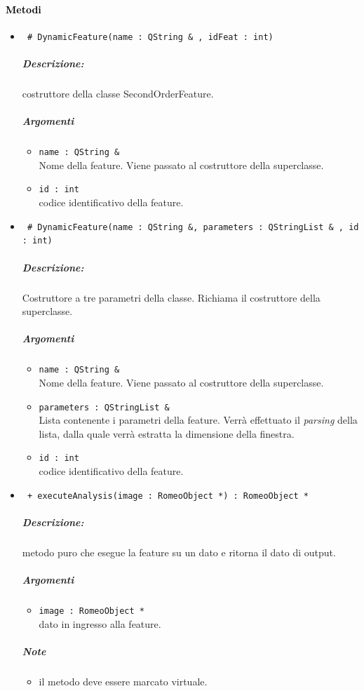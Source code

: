 \paragraph{\textcolor{black}{Metodi\\}}
	\begin{itemize}
	\item \color{blue}\verb! # DynamicFeature(name : QString & , idFeat : int)!
		\color{black}
		\subparagraph{Descrizione:} costruttore della classe SecondOrderFeature.
		\subparagraph{Argomenti}
			\begin{itemize}
				\item \color{RoyalPurple} \verb!name : QString &! \\ 
				\color{black} Nome della feature. Viene passato al costruttore della superclasse.	
				\item \color{RoyalPurple} \verb!id : int! \\ 
				\color{black} codice identificativo della feature\g{}.	
			\end{itemize}
			
	\item \color{blue}\verb! # DynamicFeature(name : QString &, parameters : QStringList & , id : int)!
		\color{black}
		\subparagraph{Descrizione:} Costruttore a tre parametri della classe. Richiama il costruttore della 						superclasse.
		\subparagraph{Argomenti}
			\begin{itemize}
				\item \color{RoyalPurple} \verb!name : QString &! \\ 
				\color{black} Nome della feature. Viene passato al costruttore della superclasse.	
				\item \color{RoyalPurple} \verb!parameters : QStringList &! \\ 
				\color{black} Lista contenente i parametri della feature\g{}. Verrà effettuato il \textit{parsing} 						della lista, dalla quale verrà estratta la dimensione della finestra.
				\item \color{RoyalPurple} \verb!id : int! \\ 
				\color{black} codice identificativo della feature\g{}.	
			\end{itemize}
			
	\item \color{blue}\verb! + executeAnalysis(image : RomeoObject *) : RomeoObject *!
		\color{black}
		\subparagraph{Descrizione:} metodo puro che esegue la feature su un dato e ritorna il dato di output.
		\subparagraph{Argomenti}
			\begin{itemize}
				\item \color{RoyalPurple} \verb!image : RomeoObject * ! \\ 
				\color{black} dato in ingresso alla feature.		
			\end{itemize}
		\subparagraph{Note}
			\begin{itemize}
				\item il metodo deve essere marcato virtuale.
			\end{itemize}
						

\end{itemize}
